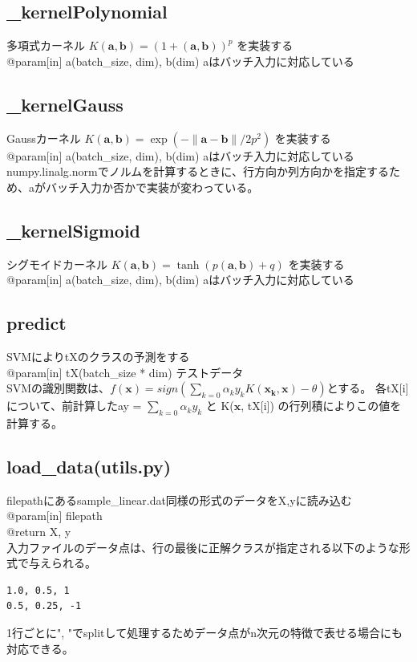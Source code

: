 \documentclass{jsarticle}
\begin{document}
\subsection*{\_kernelPolynomial}
多項式カーネル $K(\bm{a}, \bm{b}) = (1 + (\bm{a}, \bm{b}))^p$ を実装する \\
@param[in] a(batch\_size, dim), b(dim) aはバッチ入力に対応している 

\subsection*{\_kernelGauss}
Gaussカーネル $K(\bm{a}, \bm{b}) = \exp(-\|\bm{a}-\bm{b}\| / 2p^2)$ を実装する \\
@param[in] a(batch\_size, dim), b(dim) aはバッチ入力に対応している \\
numpy.linalg.normでノルムを計算するときに、行方向か列方向かを指定するため、aがバッチ入力か否かで実装が変わっている。

\subsection*{\_kernelSigmoid}
シグモイドカーネル $K(\bm{a}, \bm{b}) = \tanh (p(\bm{a}, \bm{b}) + q)$ を実装する \\
@param[in] a(batch\_size, dim), b(dim) aはバッチ入力に対応している

\subsection*{predict}
SVMによりtXのクラスの予測をする \\
@param[in] tX(batch\_size * dim) テストデータ \\
SVMの識別関数は、$f(\bm{x}) = sign(\sum_{k=0} \alpha_k y_k K(\bm{x_k}, \bm{x}) - \theta)$とする。
各tX[i]について、前計算したay = $\sum_{k=0} \alpha_k y_k$ と K($\bm{x}$, tX[i]) の行列積によりこの値を計算する。

\subsection*{load\_data(utils.py)}
filepathにあるsample\_linear.dat同様の形式のデータをX,yに読み込む \\
@param[in] filepath \\
@return X, y \\
入力ファイルのデータ点は、行の最後に正解クラスが指定される以下のような形式で与えられる。
\begin{lstlisting}
1.0, 0.5, 1
0.5, 0.25, -1
\end{lstlisting}
1行ごとに", "でsplitして処理するためデータ点がn次元の特徴で表せる場合にも対応できる。
\end{document}
